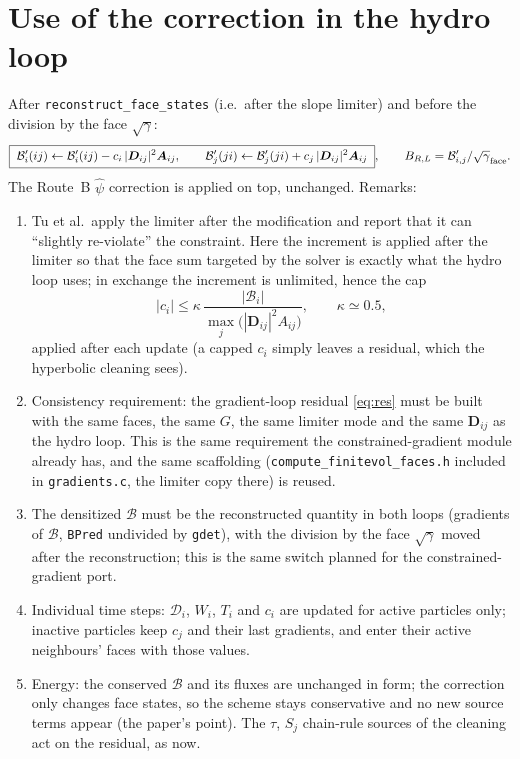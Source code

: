 \documentclass[11pt,a4paper]{article}
\newcommand{\cB}{\mathcal{B}}
\newcommand{\cD}{\mathcal{D}}
\newcommand{\bA}{\bm{A}}
\newcommand{\bD}{\bm{D}}
\newcommand{\sg}{\sqrt{\gamma}}
\newcommand{\code}[1]{\texttt{#1}}
\begin{document}
\section{Use of the correction in the hydro loop}\label{sec:hydro}
After \code{reconstruct\_face\_states} (i.e.\ after the slope limiter) and before the division by the face $\sg$:
\begin{equation}
\boxed{\;\cB'_i(ij)\leftarrow\cB'_i(ij)-c_i\,|\bD_{ij}|^2\bA_{ij},\qquad
\cB'_j(ji)\leftarrow\cB'_j(ji)+c_j\,|\bD_{ij}|^2\bA_{ij}\;},\qquad
B_{R,L}=\cB'_{i,j}/\sg_{\rm face}.
\label{eq:hydro}
\end{equation}
The Route~B $\hat\psi$ correction is applied on top, unchanged. Remarks:
\begin{enumerate}
\item Tu et al.\ apply the limiter after the modification and report that it can ``slightly re-violate'' the constraint. Here the increment is applied after the limiter so that the face sum targeted by the solver is exactly what the hydro loop uses; in exchange the increment is unlimited, hence the cap
\begin{equation}
|c_i|\le\kappa\,\frac{|\cB_i|}{\max_j\big(|\bD_{ij}|^2A_{ij}\big)},\qquad\kappa\simeq0.5,
\label{eq:cap}
\end{equation}
applied after each update (a capped $c_i$ simply leaves a residual, which the hyperbolic cleaning sees).
\item Consistency requirement: the gradient-loop residual \eqref{eq:res} must be built with the same faces, the same $G$, the same limiter mode and the same $\bD_{ij}$ as the hydro loop. This is the same requirement the constrained-gradient module already has, and the same scaffolding (\code{compute\_finitevol\_faces.h} included in \code{gradients.c}, the limiter copy there) is reused.
\item The densitized $\cB$ must be the reconstructed quantity in both loops (gradients of $\cB$, \code{BPred} undivided by \code{gdet}), with the division by the face $\sg$ moved after the reconstruction; this is the same switch planned for the constrained-gradient port.
\item Individual time steps: $\cD_i$, $W_i$, $T_i$ and $c_i$ are updated for active particles only; inactive particles keep $c_j$ and their last gradients, and enter their active neighbours' faces with those values.
\item Energy: the conserved $\cB$ and its fluxes are unchanged in form; the correction only changes face states, so the scheme stays conservative and no new source terms appear (the paper's point). The $\tau$, $S_j$ chain-rule sources of the cleaning act on the residual, as now.
\end{enumerate}
\end{document}
